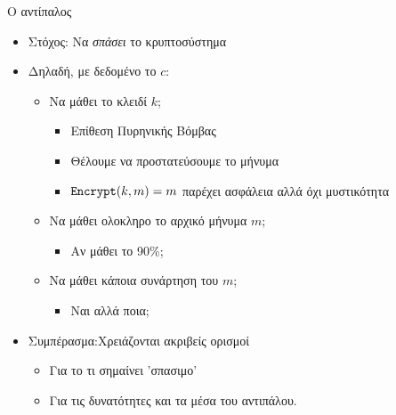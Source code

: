 \documentclass[handout]{beamer}
\begin{document}
\begin{frame}{Ο αντίπαλος \adv}
\begin{itemize}
\item Στόχος: Να \emph{σπάσει} το κρυπτοσύστημα
\item Δηλαδή, με δεδομένο το $c$:
\pause
\begin{itemize}
\item Να μάθει το κλειδί $k$; 
\pause
\begin{itemize}
\item Επίθεση Πυρηνικής Βόμβας
\item Θέλουμε να προστατεύσουμε το μήνυμα
\item $\mathtt{Encrypt}(k,m)=m$ παρέχει ασφάλεια αλλά όχι μυστικότητα
\end{itemize}
\pause
\item Να μάθει ολοκληρο το αρχικό μήνυμα $m$;
\begin{itemize}
\item Αν μάθει το 90\%;
\end{itemize}
\pause
\item Να μάθει κάποια συνάρτηση του $m$;
\begin{itemize}
\item Ναι αλλά ποια;
\end{itemize}
\end{itemize}
\pause
\item Συμπέρασμα:Χρειάζονται ακριβείς ορισμοί
\begin{itemize}
\item Για το τι σημαίνει 'σπασιμο'
\item Για τις δυνατότητες και τα μέσα του αντιπάλου.
\end{itemize}
\end{itemize}
\end{frame}
\end{document}
